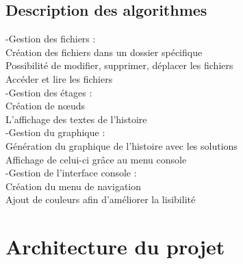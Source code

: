 \documentclass[12pt]{article}
\begin{document}
\subsection{Description des algorithmes}
\noindent
-Gestion des fichiers : \\
\indent
Création des fichiers dans un dossier spécifique\\
\indent
Possibilité de modifier, supprimer, déplacer les fichiers\\
\indent
Accéder et lire les fichiers\\
-Gestion des étages :\\
\indent
	Création de nœuds\\
\indent
	L'affichage des textes de l'histoire \\
-Gestion du graphique :\\
\indent	
	Génération du graphique de l'histoire avec les solutions\\
\indent	
	Affichage de celui-ci grâce au menu console\\
-Gestion de l'interface console :\\
\indent	
	Création du menu de navigation\\
\indent	
	Ajout de couleurs afin d'améliorer la lisibilité\\

\clearpage
\section{Architecture du projet}
\end{document}
